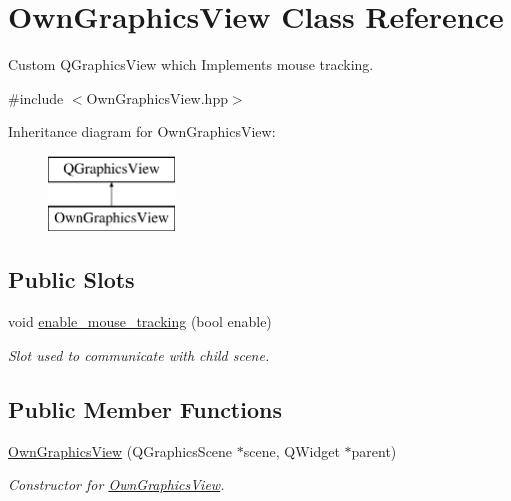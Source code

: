 \hypertarget{classOwnGraphicsView}{}\section{Own\+Graphics\+View Class Reference}
\label{classOwnGraphicsView}


Custom Q\+Graphics\+View which Implements mouse tracking.  




{\ttfamily \#include $<$Own\+Graphics\+View.\+hpp$>$}

Inheritance diagram for Own\+Graphics\+View\+:\begin{figure}[H]
\begin{center}
\leavevmode
\includegraphics[height=2.000000cm]{classOwnGraphicsView}
\end{center}
\end{figure}
\subsection*{Public Slots}
\begin{DoxyCompactItemize}
\item 
void \mbox{\hyperlink{classOwnGraphicsView_a4902ca3c748bc13040c4d869bf7be291}{enable\+\_\+mouse\+\_\+tracking}} (bool enable)
\begin{DoxyCompactList}\small\item\em Slot used to communicate with child scene. \end{DoxyCompactList}\end{DoxyCompactItemize}
\subsection*{Public Member Functions}
\begin{DoxyCompactItemize}
\item 
\mbox{\hyperlink{classOwnGraphicsView_a57f2f9617077ce2a1d30ec3f6c7144db}{Own\+Graphics\+View}} (Q\+Graphics\+Scene $\ast$scene, Q\+Widget $\ast$parent)
\begin{DoxyCompactList}\small\item\em Constructor for \mbox{\hyperlink{classOwnGraphicsView}{Own\+Graphics\+View}}. \end{DoxyCompactList}\end{DoxyCompactItemize}


